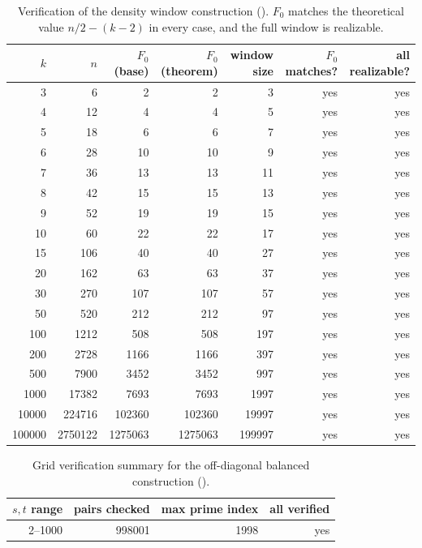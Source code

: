 \documentclass[11pt]{article}
\theoremstyle{plain}
\theoremstyle{definition}
\theoremstyle{remark}
\begin{document}
\begin{table}[htbp]
\centering
\caption{Verification of the density window construction
().  $F_0$ matches the theoretical value
$n/2-(k-2)$ in every case, and the full window is realizable.}
\label{tab:density-window-verify}
\small
\begin{tabular}{@{}rrrrrrr@{}}
\toprule
$k$ & $n$ & $F_0$ (base) & $F_0$ (theorem) & window size & $F_0$ matches? & all realizable? \\
\midrule
3 & 6 & 2 & 2 & 3 & yes & yes \\
4 & 12 & 4 & 4 & 5 & yes & yes \\
5 & 18 & 6 & 6 & 7 & yes & yes \\
6 & 28 & 10 & 10 & 9 & yes & yes \\
7 & 36 & 13 & 13 & 11 & yes & yes \\
8 & 42 & 15 & 15 & 13 & yes & yes \\
9 & 52 & 19 & 19 & 15 & yes & yes \\
10 & 60 & 22 & 22 & 17 & yes & yes \\
15 & 106 & 40 & 40 & 27 & yes & yes \\
20 & 162 & 63 & 63 & 37 & yes & yes \\
30 & 270 & 107 & 107 & 57 & yes & yes \\
50 & 520 & 212 & 212 & 97 & yes & yes \\
100 & 1212 & 508 & 508 & 197 & yes & yes \\
200 & 2728 & 1166 & 1166 & 397 & yes & yes \\
500 & 7900 & 3452 & 3452 & 997 & yes & yes \\
1000 & 17382 & 7693 & 7693 & 1997 & yes & yes \\
10000 & 224716 & 102360 & 102360 & 19997 & yes & yes \\
100000 & 2750122 & 1275063 & 1275063 & 199997 & yes & yes \\
\bottomrule
\end{tabular}

\end{table}

\begin{table}[htbp]
\centering
\caption{Grid verification summary for the off-diagonal balanced construction
().}
\label{tab:balanced-off-diagonal-grid}
\small
\begin{tabular}{@{}rrrr@{}}
\toprule
$s,t$ range & pairs checked & max prime index & all verified \\
\midrule
2--1000 & 998001 & 1998 & yes \\
\bottomrule
\end{tabular}

\end{table}
\end{document}
